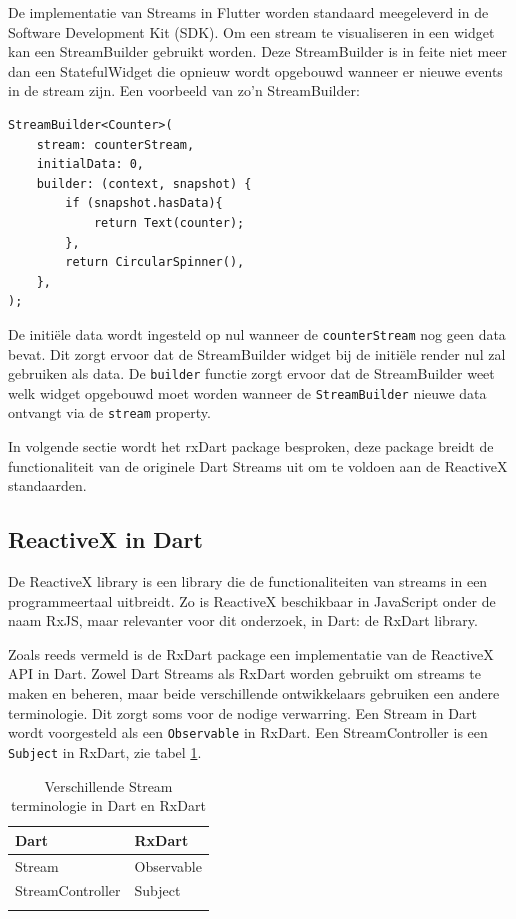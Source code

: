 De implementatie van Streams in Flutter worden standaard meegeleverd in de Software Development Kit (SDK). Om een stream te visualiseren in een widget kan een StreamBuilder gebruikt worden. Deze StreamBuilder is in feite niet meer dan een StatefulWidget die opnieuw wordt opgebouwd wanneer er nieuwe events in de stream zijn.
Een voorbeeld van zo'n StreamBuilder:
\begin{verbatim}
StreamBuilder<Counter>(
    stream: counterStream,
    initialData: 0,
    builder: (context, snapshot) {
        if (snapshot.hasData){
            return Text(counter);
        },
        return CircularSpinner(),
    },
);
\end{verbatim}
De initiële data wordt ingesteld op nul wanneer de \verb|counterStream| nog geen data bevat. Dit zorgt ervoor dat de StreamBuilder widget bij de initiële render nul zal gebruiken als data. De \verb|builder| functie zorgt ervoor dat de StreamBuilder weet welk widget opgebouwd moet worden wanneer de \verb|StreamBuilder| nieuwe data ontvangt via de \verb|stream| property.

In volgende sectie wordt het rxDart package besproken, deze package breidt de functionaliteit van de originele Dart Streams uit om te voldoen aan de ReactiveX standaarden.

\subsection*{ReactiveX in Dart}
De ReactiveX library is een library die de functionaliteiten van streams in een programmeertaal uitbreidt. Zo is ReactiveX beschikbaar in JavaScript onder de naam RxJS, maar relevanter voor dit onderzoek, in Dart: de RxDart library.


Zoals reeds vermeld is de RxDart package een implementatie van de ReactiveX API in Dart. Zowel Dart Streams als RxDart worden gebruikt om streams te maken en beheren, maar beide verschillende ontwikkelaars gebruiken een andere terminologie. Dit zorgt soms voor de nodige verwarring.
Een Stream in Dart wordt voorgesteld als een \verb|Observable| in RxDart. Een StreamController is een \verb|Subject| in RxDart, zie tabel \ref{table:terminologie-rxdart-dart}.

\begin{table}[H]
    \centering
    \begin{tabular}{ll}
        \textbf{Dart}    & \textbf{RxDart} \\ \hline
        Stream           & Observable      \\
        StreamController & Subject         \\
        &                
    \end{tabular}
    \caption{Verschillende Stream terminologie in Dart en RxDart}
    \label{table:terminologie-rxdart-dart}
\end{table}

